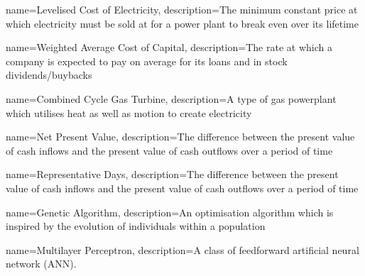 {
	name=Levelised Cost of Electricity,
	description={The minimum constant price at which electricity must be sold at for a power plant to break even over its lifetime}
}

{
	name=Weighted Average Cost of Capital,
	description={The rate at which a company is expected to pay on average for its loans and in stock dividends/buybacks}
}

{
	name=Combined Cycle Gas Turbine,
	description={A type of gas powerplant which utilises heat as well as motion to create electricity}
}

{
	name=Net Present Value,
	description={The difference between the present value of cash inflows and the present value of cash outflows over a period of time}
}

{
	name=Representative Days,
	description={The difference between the present value of cash inflows and the present value of cash outflows over a period of time}
}

{
	name=Genetic Algorithm,
	description={An optimisation algorithm which is inspired by the evolution of individuals within a population}
}

{
	name=Multilayer Perceptron,
	description={A class of feedforward artificial neural network (ANN).}
}
















